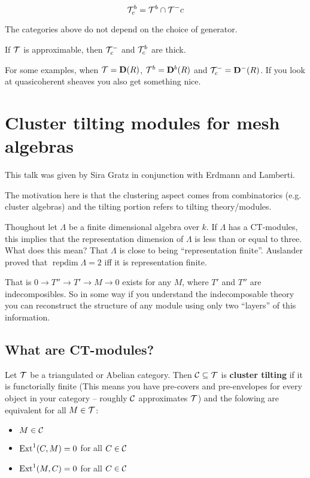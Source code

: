 \documentclass[12pt]{article}
\begin{document}
\begin{defn}
\[\mathcal{T}_c^b=\mathcal{T}^b\cap\mathcal{T}^-c\]
\end{defn}
\begin{rmk}
	The categories above do not depend on the choice of generator.
\end{rmk}
\begin{rmk}
	If $\mathcal{T}$ is approximable, then $\mathcal{T}_c^-$ and $\mathcal{T}_c^b$ are thick.
\end{rmk}

For some examples, when $\mathcal{T}=\mathbf{D}(R)$, $\mathcal{T}^b=\mathbf{D}^b(R)$ and $\mathcal{T}_c^-=\mathbf{D}^-(R)$. If you look at quasicoherent sheaves you also get something nice.

\section{Cluster tilting modules for mesh algebras}

This talk was given by Sira Gratz in conjunction with Erdmann and Lamberti.

The motivation here is that the clustering aspect comes from combinatorics (e.g. cluster algebras) and the tilting portion 
refers to tilting theory/modules. 

Thoughout let $\Lambda$ be a finite dimensional algebra over $k$. If $\Lambda$ has a CT-modules, this implies that the representation dimension of $\Lambda$ is less than or equal to three. What does this mean?
That $\Lambda$ is close to being ``representation finite''. Auslander proved that $\operatorname{repdim} \Lambda =2$ iff it is representation finite.

That is $0\to T''\to T'\to M\to 0$ exists for any $M$, where $T'$ and $T''$ are indecomposibles. So in some way if you understand the indecomposable theory
you can reconstruct the structure of any module using only two ``layers'' of this information.

\subsection{What are CT-modules?}
\begin{defn}
	Let $\mathcal{T}$ be a triangulated or Abelian category. Then $\mathcal{C}\subseteq\mathcal{T}$ is \textbf{cluster tilting}
	if it is functorially finite (This means you have pre-covers and pre-envelopes for every object in your category -- roughly $\mathcal{C}$ approximates $\mathcal{T}$) and the folowing are equivalent for all $M\in\mathcal{T}$:
	\begin{itemize}
		\item $M\in \mathcal{C}$
		\item $\operatorname{Ext}^1(C,M)=0$ for all $C\in\mathcal{C}$
		\item $\operatorname{Ext}^1(M,C)=0$ for all $C\in\mathcal{C}$
	\end{itemize}
\end{defn}
\end{document}
